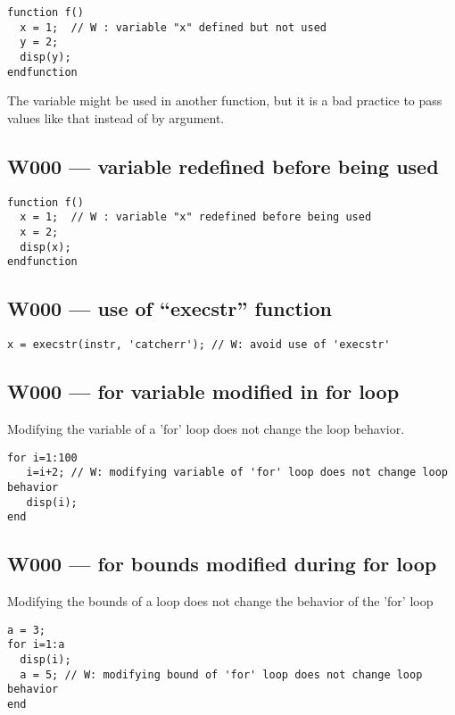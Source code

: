 \begin{verbatim}
function f()
  x = 1;  // W : variable "x" defined but not used
  y = 2;
  disp(y);
endfunction
\end{verbatim}


The variable might be used in another function, but it is
a bad practice to pass values like that instead of by argument.



\subsection{W000 --- variable redefined before being used}


\begin{verbatim}
function f()
  x = 1;  // W : variable "x" redefined before being used
  x = 2;
  disp(x);
endfunction
\end{verbatim}


\subsection{W000 --- use of ``execstr'' function     }


\begin{verbatim}
x = execstr(instr, 'catcherr'); // W: avoid use of 'execstr' 
\end{verbatim}


\subsection{W000 --- for variable modified in for loop}




Modifying the variable of a 'for' loop does not change the
loop behavior.

\begin{verbatim}
for i=1:100
   i=i+2; // W: modifying variable of 'for' loop does not change loop behavior
   disp(i);
end
\end{verbatim}


\subsection{W000 --- for bounds modified during for loop}




Modifying the bounds of a loop does not change the behavior of
the 'for' loop

\begin{verbatim}
a = 3;
for i=1:a
  disp(i);
  a = 5; // W: modifying bound of 'for' loop does not change loop behavior
end
\end{verbatim}


